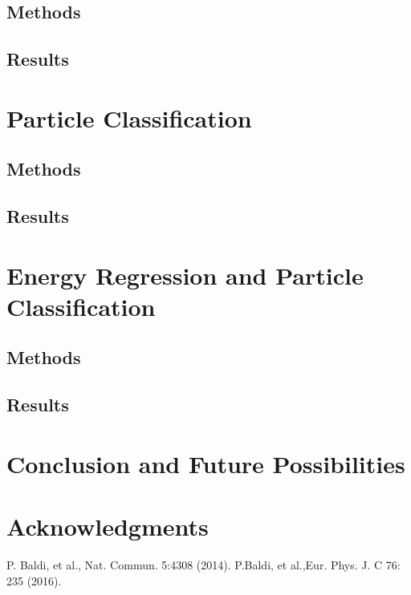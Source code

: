 \documentclass[twocolumn,aps,prd,reprint,superscriptaddress]{revtex4-1}
\begin{document}
	\subsection{Methods}
	
	
	\subsection{Results}
	
	
	\section{Particle Classification}
	
	
	\subsection{Methods}
	
	
	\subsection{Results}
	
	
	\section{Energy Regression and Particle Classification}
	
	
	\subsection{Methods}
	
	
	\subsection{Results}
	
	
	\section{Conclusion and Future Possibilities}
	
	
	\section{Acknowledgments}
	
	
	\begin{thebibliography}
		{}
		P. Baldi, et al., Nat. Commun. 5:4308 (2014).	
		P.Baldi, et al.,Eur. Phys. J. C 76: 235 (2016).
		
	\end{thebibliography}
\end{document}
